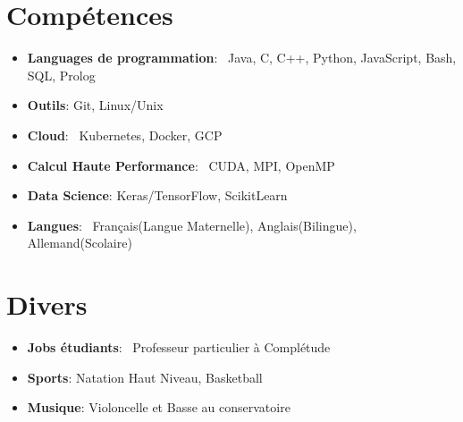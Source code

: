 \documentclass[a4paper,20pt]{article}
\newcommand{\resumeItem}[2]{
  \item\small{
    \textbf{#1}{: #2 \vspace{-2pt}}
  }
}
\newcommand{\resumeSubItem}[2]{\resumeItem{#1}{#2}\vspace{-3pt}}
\newcommand{\resumeSubHeadingListStart}{\begin{itemize}[leftmargin=*]}
\newcommand{\resumeSubHeadingListEnd}{\end{itemize}}
\begin{document}
\vspace{5pt}

\section{Compétences}
 \resumeSubHeadingListStart
  \resumeSubItem{Languages de programmation}{~Java, C, C++, Python, JavaScript, Bash, SQL, Prolog}
  \resumeSubItem{Outils}{Git, Linux/Unix}
  \resumeSubItem{Cloud}{~Kubernetes, Docker, GCP}
  \resumeSubItem{Calcul Haute Performance}{~CUDA, MPI, OpenMP}
  \resumeSubItem{Data Science}{Keras/TensorFlow, ScikitLearn}
  \resumeSubItem{Langues}{~Français(Langue Maternelle), Anglais(Bilingue), Allemand(Scolaire)}
 \resumeSubHeadingListEnd

\vspace{5pt}

\section{Divers}
 \resumeSubHeadingListStart
  \resumeSubItem{Jobs étudiants}{~Professeur particulier à Complétude}
  \resumeSubItem{Sports}{Natation Haut Niveau, Basketball}
  \resumeSubItem{Musique}{Violoncelle et Basse au conservatoire}
\resumeSubHeadingListEnd
\end{document}
